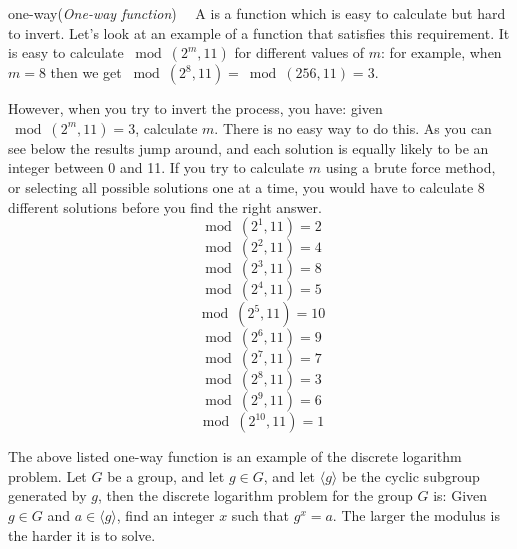 \begin{example}{one-way}(\emph{One-way function})~~
A  is a function which is easy to calculate but hard to invert.  Let's look at an example of a function that satisfies this requirement. It is easy to calculate $\bmod(2^{m},  11)$ for different values of $m$: for example, when $m =8$ then we get $\bmod(2^{8},  11) =\bmod(256,  11)  = 3$.  

However, when you try to invert the process, you have: given $\bmod(2^{m},  11) = 3$, calculate $m$. There is no easy way to do this. As you can see below the results jump around, and each solution is equally likely to be an integer between 0 and 11. If you try to calculate $m$ using a brute force method, or selecting all possible solutions one at a time, you would have to calculate 8 different solutions before you find the right answer. 
$$ \bmod(2^{1}, 11)=2$$
$$ \bmod(2^{2}, 11)=4$$
$$ \bmod(2^{3}, 11)=8$$
$$ \bmod(2^{4}, 11)=5$$
$$ \bmod(2^{5}, 11)=10$$
$$ \bmod(2^{6}, 11)=9$$
$$ \bmod(2^{7}, 11)=7$$
$$ \bmod(2^{8}, 11)=3$$
$$ \bmod(2^{9}, 11)=6$$
$$ \bmod(2^{10}, 11)=1$$
\end{example}

The above listed one-way function is an example of the discrete logarithm problem. Let $G$ be a group, and let $g \in G$, and let $\langle g \rangle$ be the cyclic subgroup generated by $g$, then the discrete logarithm problem for the group $G$ is: Given $g \in G$ and $a \in \langle g \rangle$, find an integer $x$ such that $g^{x}=a$. The larger the modulus is the harder it is to solve.

